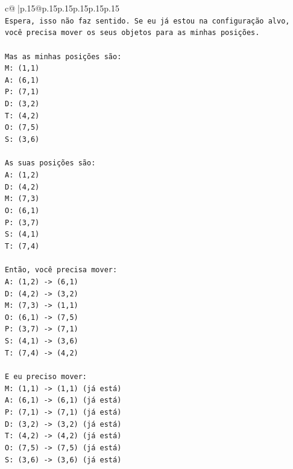 \documentclass{article}
\begin{document}
{\begin{supertabular}{c@{$\;$}|p{.15\linewidth}@{}p{.15\linewidth}p{.15\linewidth}p{.15\linewidth}p{.15\linewidth}p{.15\linewidth}}
{{{\\ 
\texttt{Espera, isso não faz sentido. Se eu já estou na configuração alvo, você precisa mover os seus objetos para as minhas posições.} \\
\\ 
\texttt{Mas as minhas posições são:} \\
\texttt{M: (1,1)} \\
\texttt{A: (6,1)} \\
\texttt{P: (7,1)} \\
\texttt{D: (3,2)} \\
\texttt{T: (4,2)} \\
\texttt{O: (7,5)} \\
\texttt{S: (3,6)} \\
\\ 
\texttt{As suas posições são:} \\
\texttt{A: (1,2)} \\
\texttt{D: (4,2)} \\
\texttt{M: (7,3)} \\
\texttt{O: (6,1)} \\
\texttt{P: (3,7)} \\
\texttt{S: (4,1)} \\
\texttt{T: (7,4)} \\
\\ 
\texttt{Então, você precisa mover:} \\
\texttt{A: (1,2) {-}> (6,1)} \\
\texttt{D: (4,2) {-}> (3,2)} \\
\texttt{M: (7,3) {-}> (1,1)} \\
\texttt{O: (6,1) {-}> (7,5)} \\
\texttt{P: (3,7) {-}> (7,1)} \\
\texttt{S: (4,1) {-}> (3,6)} \\
\texttt{T: (7,4) {-}> (4,2)} \\
\\ 
\texttt{E eu preciso mover:} \\
\texttt{M: (1,1) {-}> (1,1) (já está)} \\
\texttt{A: (6,1) {-}> (6,1) (já está)} \\
\texttt{P: (7,1) {-}> (7,1) (já está)} \\
\texttt{D: (3,2) {-}> (3,2) (já está)} \\
\texttt{T: (4,2) {-}> (4,2) (já está)} \\
\texttt{O: (7,5) {-}> (7,5) (já está)} \\
\texttt{S: (3,6) {-}> (3,6) (já está)} \\
}}}
\end{supertabular}}
\end{document}
